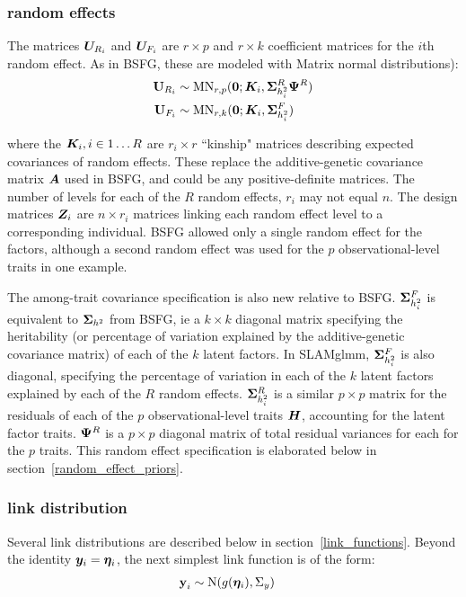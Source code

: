 \documentclass[11pt]{amsart}
\newcommand*{\B}[1]{\ifmmode\bm{#1}\else\textbf{#1}\fi}
\begin{document}
\subsubsection{random effects}
The matrices $\B{U}_{R_i}$ and $\B{U}_{F_i}$ are $r \times p$ and $r \times k$ coefficient matrices for the $i$th random effect. As in BSFG, these are modeled with Matrix normal distributions):
\begin{align} \begin{split}
\B{U}_{R_i} &\sim \mbox{MN}_{r,p}(\B{0};\B{K}_i,\B{\Sigma}^R_{h^2_{i}}\B{\Psi}^R) \\
\B{U}_{F_i} &\sim \mbox{MN}_{r,k}(\B{0};\B{K}_i,\B{\Sigma}^F_{h^2_{i}})
\end{split} \end{align}

\noindent where the $\B{K}_i, i \in 1\dots R$ are $r_i \times r$ ``kinship" matrices describing expected covariances of random effects. These replace the additive-genetic covariance matrix $\B{A}$ used in BSFG, and could be any positive-definite matrices. The number of levels for each of the $R$ random effects, $r_i$ may not equal $n$. The design matrices $\B{Z}_i$ are $n \times r_i$ matrices linking each random effect level to a corresponding individual. BSFG allowed only a single random effect for the factors, although a second random effect was used for the $p$ observational-level traits in one example. 

The among-trait covariance specification is also new relative to BSFG. $\B{\Sigma}^F_{h^2_i}$ is equivalent to $\B{\Sigma}_{h^2}$ from BSFG, ie a $k \times k$ diagonal matrix specifying the heritability (or percentage of variation explained by the additive-genetic covariance matrix) of each of the $k$ latent factors. In SLAMglmm, $\B{\Sigma}^F_{h^2_i}$ is also diagonal, specifying the percentage of variation in each of the $k$ latent factors explained by each of the $R$ random effects. $\B{\Sigma}^R_{h^2_i}$ is a similar $p \times p$ matrix for the residuals of each of the $p$ observational-level traits $\B{H}$, accounting for the latent factor traits. $\B{\Psi}^R$ is a $p \times p$ diagonal matrix of total residual variances for each for the $p$ traits. This random effect specification is elaborated below in section~\ref{random_effect_priors}.

\subsubsection{link distribution}
Several link distributions are described below in section~\ref{link_functions}. 
Beyond the identity $\B{y}_i = \B{\eta}_i$, the next simplest link function is of the form:
\begin{align}
\B{y}_i &\sim \mbox{N}(g(\B{\eta}_i),\Sigma_y)
\end{align}
\end{document}

